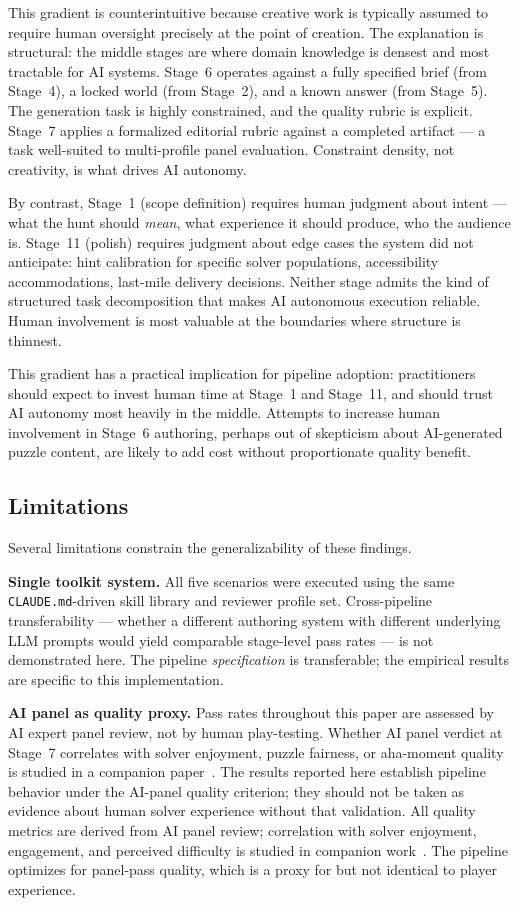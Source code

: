 This gradient is counterintuitive because creative work is typically assumed to require human oversight precisely at the point of creation. The explanation is structural: the middle stages are where domain knowledge is densest and most tractable for AI systems. Stage~6 operates against a fully specified brief (from Stage~4), a locked world (from Stage~2), and a known answer (from Stage~5). The generation task is highly constrained, and the quality rubric is explicit. Stage~7 applies a formalized editorial rubric against a completed artifact — a task well-suited to multi-profile panel evaluation. Constraint density, not creativity, is what drives AI autonomy.

By contrast, Stage~1 (scope definition) requires human judgment about intent — what the hunt should \emph{mean}, what experience it should produce, who the audience is. Stage~11 (polish) requires judgment about edge cases the system did not anticipate: hint calibration for specific solver populations, accessibility accommodations, last-mile delivery decisions. Neither stage admits the kind of structured task decomposition that makes AI autonomous execution reliable. Human involvement is most valuable at the boundaries where structure is thinnest.

This gradient has a practical implication for pipeline adoption: practitioners should expect to invest human time at Stage~1 and Stage~11, and should trust AI autonomy most heavily in the middle. Attempts to increase human involvement in Stage~6 authoring, perhaps out of skepticism about AI-generated puzzle content, are likely to add cost without proportionate quality benefit.

\subsection{Limitations}

Several limitations constrain the generalizability of these findings.

\textbf{Single toolkit system.} All five scenarios were executed using the same \texttt{CLAUDE.md}-driven skill library and reviewer profile set. Cross-pipeline transferability — whether a different authoring system with different underlying LLM prompts would yield comparable stage-level pass rates — is not demonstrated here. The pipeline \emph{specification} is transferable; the empirical results are specific to this implementation.

\textbf{AI panel as quality proxy.} Pass rates throughout this paper are assessed by AI expert panel review, not by human play-testing. Whether AI panel verdict at Stage~7 correlates with solver enjoyment, puzzle fairness, or aha-moment quality is studied in a companion paper~\cite{dellaLibera2025calibration}. The results reported here establish pipeline behavior under the AI-panel quality criterion; they should not be taken as evidence about human solver experience without that validation. All quality metrics are derived from AI panel review; correlation with solver enjoyment, engagement, and perceived difficulty is studied in companion work~\cite{dellaLibera2025calibration}. The pipeline optimizes for panel-pass quality, which is a proxy for but not identical to player experience.


